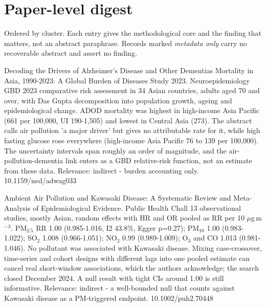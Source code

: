 \documentclass[10pt]{article}
\begin{document}
\vspace{4mm}

\par{}\baselineskip{}\baselineskip
\section*{\sffamily\bfseries\color{Deep}Paper-level digest}
\vspace{-1.5mm}{\color{Amber}\rule{\linewidth}{1.1pt}}\vspace{2.5mm}

{\fontsize{7.4}{9}\selectfont\color{Slate}Ordered by cluster. Each entry gives the
methodological core and the finding that matters, not an abstract paraphrase. Records
marked \textit{metadata only} carry no recoverable abstract and assert no finding.\par}


{Decoding the Drivers of Alzheimer's Disease and Other Dementias Mortality in Asia, 1990-2023: A Global Burden of Diseases Study 2023.}
{Neuroepidemiology}
{GBD 2023 comparative risk assessment in 34 Asian countries, adults aged 70 and over, with Das Gupta decomposition into population growth, ageing and epidemiological change. ADOD mortality was highest in high-income Asia Pacific (661 per 100,000, UI 190-1,505) and lowest in Central Asia (273). The abstract calls air pollution 'a major driver' but gives no attributable rate for it, while high fasting glucose rose everywhere (high-income Asia Pacific 76 to 139 per 100,000). The uncertainty intervals span roughly an order of magnitude, and the air-pollution-dementia link enters as a GBD relative-risk function, not an estimate from these data. Relevance: indirect - burden accounting only.}
{10.1159/ned/adwag033}

\par{}\baselineskip{}\baselineskip
{}

{Ambient Air Pollution and Kawasaki Disease: A Systematic Review and Meta-Analysis of Epidemiological Evidence.}
{Public Health Chall}
{13 observational studies, mostly Asian, random effects with HR and OR pooled as RR per 10 $\mu$g\,m$^{-3}$. PM$_{2.5}$ RR 1.00 (0.985-1.016, I2 43.8\%, Egger p=0.27); PM$_{10}$ 1.00 (0.983-1.022); SO$_2$ 1.008 (0.966-1.051); NO$_2$ 0.99 (0.989-1.009); O$_3$ and CO 1.013 (0.981-1.046). No pollutant was associated with Kawasaki disease. Mixing case-crossover, time-series and cohort designs with different lags into one pooled estimate can cancel real short-window associations, which the authors acknowledge; the search closed December 2024. A null result with tight CIs around 1.00 is still informative. Relevance: indirect - a well-bounded null that counts against Kawasaki disease as a PM-triggered endpoint.}
{10.1002/puh2.70448}
\end{document}
